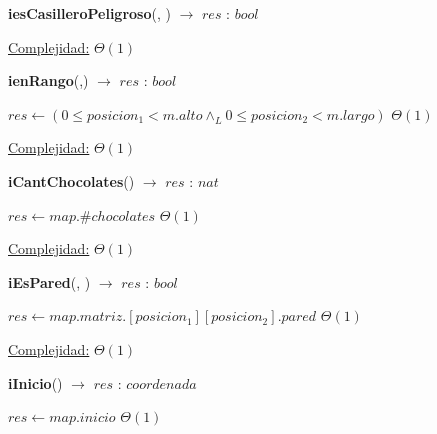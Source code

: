 \documentclass[10pt, a4paper]{article}
\begin{document}
\begin{Algoritmos}
\begin{algorithm}[H]{\textbf{iesCasilleroPeligroso}(, ) $\to$ $res$ : $bool$}
\begin{algorithmic}[1]
            \medskip
            \Statex \underline{Complejidad:} $\Theta(1)$
            \end{algorithmic}
        \end{algorithm}

        \begin{algorithm}[H]{\textbf{ienRango}(,) $\to$ $res$ : $bool$}
            \begin{algorithmic}[1]
                \State $res \gets (0\leq posicion_1< m.alto \wedge_L  0\leq posicion_2<m.largo)$                                                                 \Comment $\Theta(1)$
                
                \medskip
                \Statex \underline{Complejidad:} $\Theta(1)$
            \end{algorithmic}
        \end{algorithm}

        \begin{algorithm}[H]{\textbf{iCantChocolates}() $\to$ $res$ : $nat$}
            \begin{algorithmic}[1]
                    \State $res \gets map.\#chocolates$                                                                   \Comment $\Theta(1)$
    
                    \medskip
                    \Statex \underline{Complejidad:} $\Theta(1)$
                \end{algorithmic}
        \end{algorithm}
        
        \begin{algorithm}[H]{\textbf{iEsPared}(, ) $\to$ $res$ : $bool$}
            \begin{algorithmic}[1]
                    \State $res \gets map.matriz.[posicion_1][posicion_2].pared$                                                                 \Comment $\Theta(1)$
    
                    \medskip
                    \Statex \underline{Complejidad:} $\Theta(1)$
                \end{algorithmic}
        \end{algorithm}
        
        \begin{algorithm}[H]{\textbf{iInicio}() $\to$ $res$ : $coordenada$}
            \begin{algorithmic}[1]
                    \State $res \gets map.inicio$                                                               \Comment $\Theta(1)$
    

\end{algorithmic}
\end{algorithm}
\end{Algoritmos}
\end{document}
